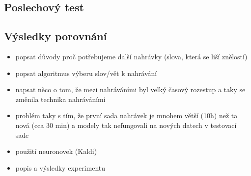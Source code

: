 \subsection{Poslechový test}

\subsection{Výsledky porovnání}

\begin{itemize}
  \item popsat důvody proč potřebujeme další nahrávky (slova, která se liší znělostí)
  \item popsat algoritmus výberu slov/vět k nahrávání
  \item napsat něco o tom, že mezi nahráváními byl velký časový rozestup a taky se změnila technika nahráváními
  \item problém taky s tím, že první sada nahrávek je mnohem větší (10h) než ta nová (cca 30 min) a modely tak nefungovali na nových datech v testovací sade
  \item použití neuronovek (Kaldi)
  \item popis a výsledky experimentu 
\end{itemize}
